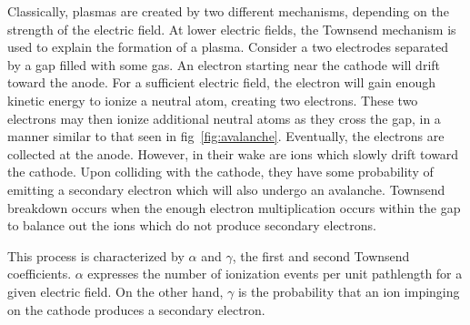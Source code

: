 {Classically, plasmas are created by two different mechanisms, depending on the
strength of the electric field. At lower electric fields, the Townsend mechanism
is used to explain the formation of a plasma. Consider a two electrodes
separated by a gap filled with some gas. An electron starting near the cathode
will drift toward the anode. For a sufficient electric field, the electron will
gain enough kinetic energy to ionize a neutral atom, creating two electrons.
These two electrons may then ionize additional neutral atoms as they cross the
gap, in a manner similar to that seen in fig~\ref{fig:avalanche}. Eventually,
the electrons are collected at the anode. However, in their wake are ions which
slowly drift toward the cathode. Upon colliding with the cathode, they have some
probability of emitting a secondary electron which will also undergo an
avalanche. Townsend breakdown occurs when the enough electron multiplication
occurs within the gap to balance out the ions which do not produce secondary
electrons.

This process is characterized by $\alpha$ and $\gamma$, the first and second
Townsend coefficients. $\alpha$ expresses the number of ionization events per
unit pathlength for a given electric field. On the other hand, $\gamma$ is the
probability that an ion impinging on the cathode produces a secondary electron.

}
